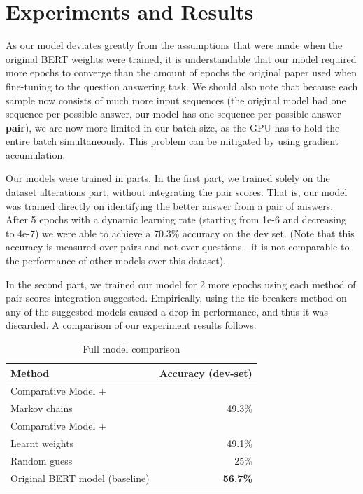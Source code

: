 \documentclass{article}
\begin{document}
\section{Experiments and Results} 

As our model deviates greatly from the assumptions that were made when the original BERT weights were trained, it is understandable that our model required more epochs to converge than the amount of epochs the original paper used when fine-tuning to the question answering task.
We should also note that because each sample now consists of much more input sequences (the original model had one sequence per possible answer, our model has one sequence per possible answer \textbf{pair}), we are now more limited in our batch size, as the GPU has to hold the entire batch simultaneously. This problem can be mitigated by using gradient accumulation.

Our models were trained in parts.
In the first part, we trained solely on the dataset alterations part, without integrating the pair scores. That is, our model was trained directly on identifying the better answer from a pair of answers. After 5 epochs with a dynamic learning rate (starting from 1e-6 and decreasing to 4e-7) we were able to achieve a 70.3\% accuracy on the dev set. (Note that this accuracy is measured over pairs and not over questions - it is not comparable to the performance of other models over this dataset).

In the second part, we trained our model for 2 more epochs using each method of pair-scores integration suggested. Empirically, using the tie-breakers method on any of the suggested models caused a drop in performance, and thus it was discarded.
A comparison of our experiment results follows.

\begin{table}[h!]
	\label{tbl:accuracy}
	\vskip 0.15in
	\begin{center}
		\begin{small}
			\begin{sc}
				\begin{tabular}{lr}
					\toprule
					Method	& Accuracy (dev-set)\\
					\midrule
					Comparative Model + \\ \qquad \qquad Markov chains 	& 49.3\% \\
					Comparative Model + \\ \qquad \qquad Learnt weights 	& 49.1\% \\
					\midrule
					Random guess & 25\% \\
					Original BERT model (baseline) & \textbf{56.7\%} \\
					\bottomrule
				\end{tabular}
			\end{sc}
		\end{small}
	\end{center}
	\vskip -0.1in
	\caption{Full model comparison}
\end{table}
\end{document}
